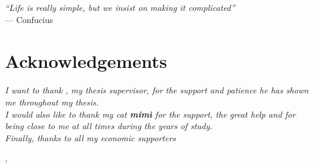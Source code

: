 \cleardoublepage
{}
{}

\begin{flushright}{
    \slshape
    ``Life is really simple, but we insist on making it complicated''} \\
    \medskip
    --- Confucius
\end{flushright}


\bigskip

\begingroup
\let\clearpage\relax
\let\cleardoublepage\relax
\let\cleardoublepage\relax

\chapter*{Acknowledgements}

\noindent \textit{I want to thank \myProf, my thesis supervisor, for the support and patience he has shown me throughout my thesis.}\\

\noindent \textit{I would also like to thank my cat \textbf{mimì} for the support, the great help and for being close to me at all times during the years of study.}\\

\noindent \textit{Finally, thanks to all my economic supporters}\\

\bigskip

\noindent\textit{\myLocation, \myTime}
\hfill \myName

\endgroup
